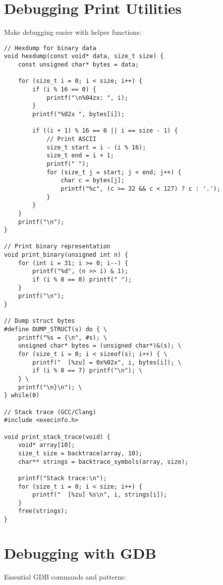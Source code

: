 \section{Debugging Print Utilities}

Make debugging easier with helper functions:

\begin{lstlisting}
// Hexdump for binary data
void hexdump(const void* data, size_t size) {
    const unsigned char* bytes = data;

    for (size_t i = 0; i < size; i++) {
        if (i % 16 == 0) {
            printf("\n%04zx: ", i);
        }
        printf("%02x ", bytes[i]);

        if ((i + 1) % 16 == 0 || i == size - 1) {
            // Print ASCII
            size_t start = i - (i % 16);
            size_t end = i + 1;
            printf(" ");
            for (size_t j = start; j < end; j++) {
                char c = bytes[j];
                printf("%c", (c >= 32 && c < 127) ? c : '.');
            }
        }
    }
    printf("\n");
}

// Print binary representation
void print_binary(unsigned int n) {
    for (int i = 31; i >= 0; i--) {
        printf("%d", (n >> i) & 1);
        if (i % 8 == 0) printf(" ");
    }
    printf("\n");
}

// Dump struct bytes
#define DUMP_STRUCT(s) do { \
    printf("%s = {\n", #s); \
    unsigned char* bytes = (unsigned char*)&(s); \
    for (size_t i = 0; i < sizeof(s); i++) { \
        printf("  [%zu] = 0x%02x", i, bytes[i]); \
        if (i % 8 == 7) printf("\n"); \
    } \
    printf("\n}\n"); \
} while(0)

// Stack trace (GCC/Clang)
#include <execinfo.h>

void print_stack_trace(void) {
    void* array[10];
    size_t size = backtrace(array, 10);
    char** strings = backtrace_symbols(array, size);

    printf("Stack trace:\n");
    for (size_t i = 0; i < size; i++) {
        printf("  [%zu] %s\n", i, strings[i]);
    }
    free(strings);
}
\end{lstlisting}

\section{Debugging with GDB}

Essential GDB commands and patterns:

